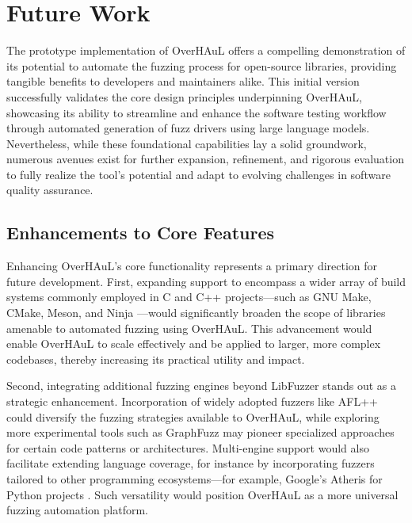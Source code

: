 \documentclass[
  a4paper,
  DIV=11,
  numbers=noendperiod]{scrreprt}
\theoremstyle{definition}
\theoremstyle{remark}
\begin{document}

\chapter{Future Work}\label{future-work-1}

The prototype implementation of OverHAuL offers a compelling
demonstration of its potential to automate the fuzzing process for
open-source libraries, providing tangible benefits to developers and
maintainers alike. This initial version successfully validates the core
design principles underpinning OverHAuL, showcasing its ability to
streamline and enhance the software testing workflow through automated
generation of fuzz drivers using large language models. Nevertheless,
while these foundational capabilities lay a solid groundwork, numerous
avenues exist for further expansion, refinement, and rigorous evaluation
to fully realize the tool's potential and adapt to evolving challenges
in software quality assurance.

\section{Enhancements to Core
Features}\label{enhancements-to-core-features}

Enhancing OverHAuL's core functionality represents a primary direction
for future development. First, expanding support to encompass a wider
array of build systems commonly employed in C and C++ projects---such as
GNU Make, CMake, Meson, and Ninja
\autocite{cedilnik2000,feldman1979,martin2025,pakkanen2025}---would
significantly broaden the scope of libraries amenable to automated
fuzzing using OverHAuL. This advancement would enable OverHAuL to scale
effectively and be applied to larger, more complex codebases, thereby
increasing its practical utility and impact.

Second, integrating additional fuzzing engines beyond LibFuzzer stands
out as a strategic enhancement. Incorporation of widely adopted fuzzers
like AFL++ \autocite{aflpp} could diversify the fuzzing strategies
available to OverHAuL, while exploring more experimental tools such as
GraphFuzz \autocite{green2022} may pioneer specialized approaches for
certain code patterns or architectures. Multi-engine support would also
facilitate extending language coverage, for instance by incorporating
fuzzers tailored to other programming ecosystems---for example, Google's
Atheris for Python projects \autocite{atheris}. Such versatility would
position OverHAuL as a more universal fuzzing automation platform.
\end{document}
